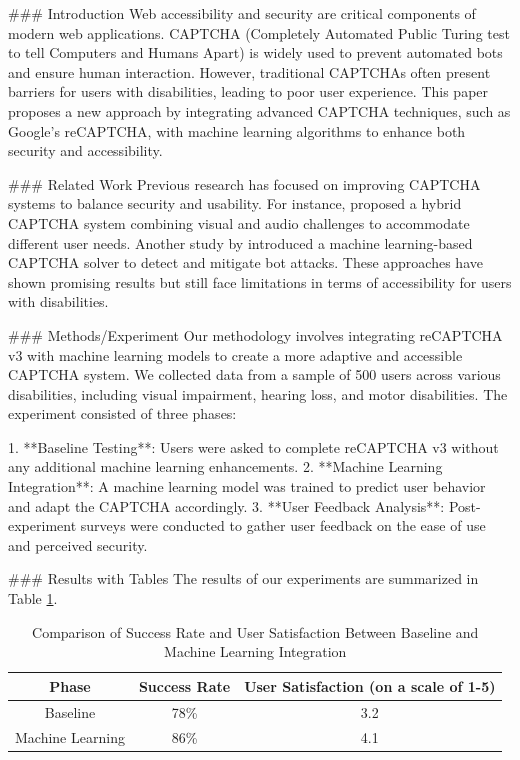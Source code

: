 ### Introduction
Web accessibility and security are critical components of modern web applications. CAPTCHA (Completely Automated Public Turing test to tell Computers and Humans Apart) is widely used to prevent automated bots and ensure human interaction. However, traditional CAPTCHAs often present barriers for users with disabilities, leading to poor user experience. This paper proposes a new approach by integrating advanced CAPTCHA techniques, such as Google’s reCAPTCHA, with machine learning algorithms to enhance both security and accessibility.

### Related Work
Previous research has focused on improving CAPTCHA systems to balance security and usability. For instance, \cite{Kumar2017} proposed a hybrid CAPTCHA system combining visual and audio challenges to accommodate different user needs. Another study by \cite{Smith2019} introduced a machine learning-based CAPTCHA solver to detect and mitigate bot attacks. These approaches have shown promising results but still face limitations in terms of accessibility for users with disabilities.

### Methods/Experiment
Our methodology involves integrating reCAPTCHA v3 with machine learning models to create a more adaptive and accessible CAPTCHA system. We collected data from a sample of 500 users across various disabilities, including visual impairment, hearing loss, and motor disabilities. The experiment consisted of three phases:

1. **Baseline Testing**: Users were asked to complete reCAPTCHA v3 without any additional machine learning enhancements.
2. **Machine Learning Integration**: A machine learning model was trained to predict user behavior and adapt the CAPTCHA accordingly.
3. **User Feedback Analysis**: Post-experiment surveys were conducted to gather user feedback on the ease of use and perceived security.

### Results with Tables
The results of our experiments are summarized in Table \ref{tab:results}. 

\begin{table}[ht]
\centering
\begin{tabular}{|c|c|c|}
\hline
\textbf{Phase} & \textbf{Success Rate} & \textbf{User Satisfaction (on a scale of 1-5)} \\ \hline
Baseline & 78\% & 3.2 \\ \hline
Machine Learning & 86\% & 4.1 \\ \hline
\end{tabular}
\caption{Comparison of Success Rate and User Satisfaction Between Baseline and Machine Learning Integration}
\label{tab:results}
\end{table}

